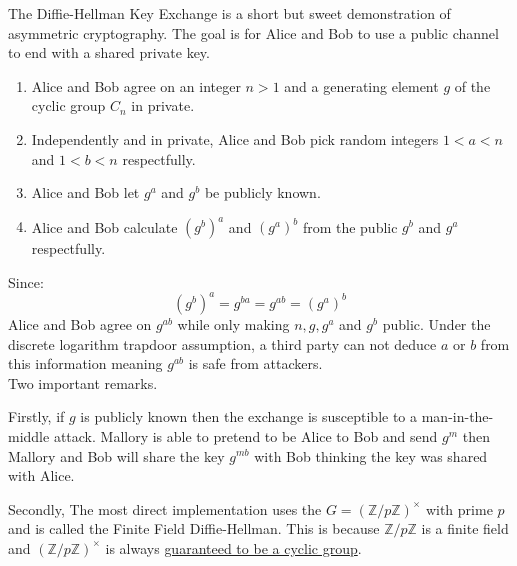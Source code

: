 
The Diffie-Hellman Key Exchange is a short but sweet demonstration of asymmetric cryptography.
The goal is for Alice and Bob to use a public channel to end with a shared private key.

\begin{enumerate}
\item Alice and Bob agree on an integer $n>1$ and a generating element $g$ of the cyclic group $C_n$ in private. 
\item Independently and in private,
Alice and Bob pick random integers $1<a<n$ and $1<b<n$ respectfully.
\item Alice and Bob let $g^a$ and $g^b$ be publicly known.
\item Alice and Bob calculate $(g^b)^a$ and $(g^a)^b$ from the public $g^b$ and $g^a$ respectfully.
\end{enumerate}

Since:
\[(g^b)^a = g^{ba} = g^{ab} = (g^a)^b\]
Alice and Bob agree on $g^{ab}$ while only making $n,g,g^a$ and $g^b$ public.
Under the discrete logarithm trapdoor assumption, 
a third party can not deduce $a$ or $b$ from this information meaning $g^{ab}$ is safe from attackers.
\\

Two important remarks.

Firstly,
if $g$ is publicly known then the exchange is susceptible to a man-in-the-middle attack.
Mallory is able to pretend to be Alice to Bob and send $g^m$ then Mallory and Bob will share the key $g^{mb}$ with Bob thinking the key was shared with Alice.

Secondly, 
The most direct implementation uses the $G=(\mathbb{Z}/p\mathbb{Z})^\times$ with prime $p$ and is called the Finite Field Diffie-Hellman.
This is because $\mathbb{Z}/p\mathbb{Z}$ is a finite field and $(\mathbb{Z}/p\mathbb{Z})^\times$ is always 
\hyperref[appx:cycle-multiplicative-group]{guaranteed to be a cyclic group}.
